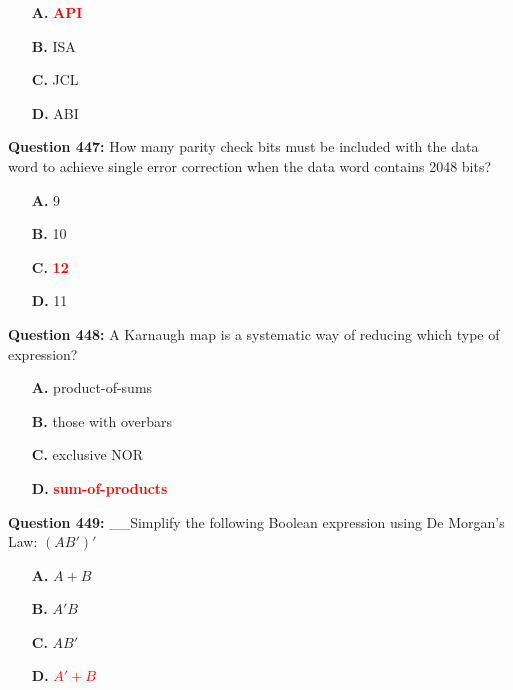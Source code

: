 \documentclass[12pt,a4paper]{article}
\begin{document}
\begin{itemize}
    \item[\textbf{A.}] \textcolor{red}{\textbf{API}}
    \item[\textbf{B.}] ISA
    \item[\textbf{C.}] JCL
    \item[\textbf{D.}] ABI
\end{itemize}

\vspace{0.5cm}

\textbf{Question 447:} How many parity check bits must be included with the data word to achieve single error correction when the data word contains 2048 bits?

\begin{itemize}
    \item[\textbf{A.}] 9
    \item[\textbf{B.}] 10
    \item[\textbf{C.}] \textcolor{red}{\textbf{12}}
    \item[\textbf{D.}] 11
\end{itemize}

\vspace{0.5cm}

\textbf{Question 448:} A Karnaugh map is a systematic way of reducing which type of expression?

\begin{itemize}
    \item[\textbf{A.}] product-of-sums
    \item[\textbf{B.}] those with overbars
    \item[\textbf{C.}] exclusive NOR
    \item[\textbf{D.}] \textcolor{red}{\textbf{sum-of-products}}
\end{itemize}

\vspace{0.5cm}

\textbf{Question 449:} __Simplify the following Boolean expression using De Morgan's Law: $(AB')'$

\begin{itemize}
    \item[\textbf{A.}] $A + B$
    \item[\textbf{B.}] $A'B$
    \item[\textbf{C.}] $AB'$
    \item[\textbf{D.}] \textcolor{red}{\textbf{$A' + B$}}
\end{itemize}
\end{document}
